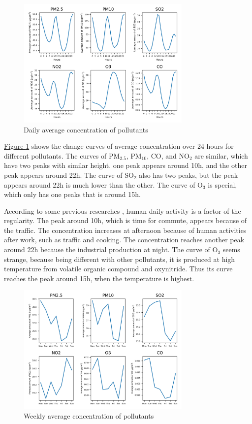 \documentclass[letterpaper]{article}
\begin{document}
\begin{CJK*}{UTF8}{gkai}
  \begin{figure}[h]
    \includegraphics[width = 8.5cm]{dailyavg_pltn.png}
    \caption{Daily average concentration of pollutants}
    \label{figure:2}
  \end{figure}

  \hyperref[figure:2]{Figure \ref*{figure:2}} shows the change curves of average concentration over 24 hours for different pollutants. The curves of PM$_{2.5}$, PM$_{10}$, CO, and NO$_{2}$ are similar, which have two peaks with similar height. one peak appears around 10h, and the other peak appears around 22h. The curve of SO$_{2}$ also has two peaks, but the peak appears around 22h is much lower than the other. The curve of O$_{3}$ is special, which only has one peaks that is around 15h.

  According to some previous researches , human daily activity is a factor of the regularity. The peak around 10h, which is time for commute, appears because of the traffic. The concentration increases at afternoon because of human activities after work, such as traffic and cooking. The concentration reaches another peak around 22h because the industrial production at night. The curve of O$_{3}$ seems strange, because being different with other pollutants, it is produced at high temperature from volatile organic compound and oxynitride. Thus its curve reaches the peak around 15h, when the temperature is highest.

  \begin{figure}[h]
    \includegraphics[width = 8.5cm]{weekavg_pltn.png}
    \caption{Weekly average concentration of pollutants}
    \label{figure:3}
  \end{figure}


\end{CJK*}
\end{document}
